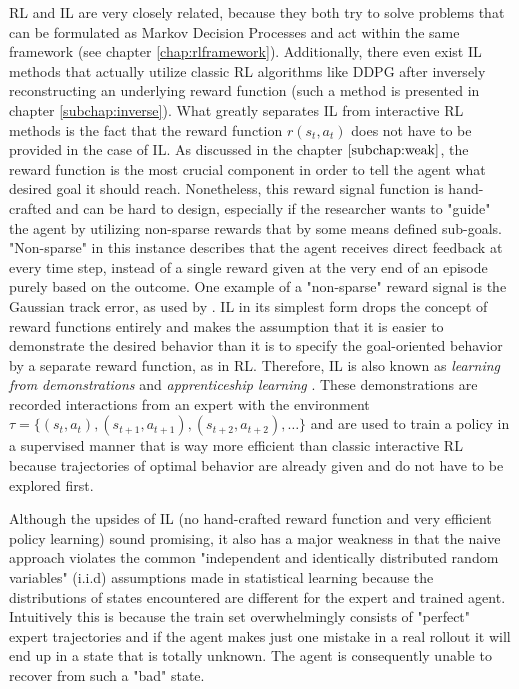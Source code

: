 \par
RL and IL are very closely related, because they both try to solve problems that can be formulated as Markov Decision Processes and act within the same framework (see chapter \ref{chap:rlframework}). Additionally, there even exist IL methods that actually utilize classic RL algorithms like DDPG after inversely reconstructing an underlying reward function (such a method is presented in chapter \ref{subchap:inverse}). What greatly separates IL from interactive RL methods is the fact that the reward function $r(s_t, a_t)$ does not have to be provided in the case of IL. As discussed in the chapter $\ref{subchap:weak}$, the reward function is the most crucial component in order to tell the agent what desired goal it should reach. Nonetheless, this reward signal function is hand-crafted and can be hard to design, especially if the researcher wants to "guide" the agent by utilizing non-sparse rewards  that by some means defined sub-goals. "Non-sparse" in this instance describes that the agent receives direct feedback at every time step, instead of a single reward given at the very end of an episode purely based on the outcome. One example of a "non-sparse" reward signal is the Gaussian track error, as used by \cite{martinsen2018curved}.
IL in its simplest form drops the concept of reward functions entirely and makes the assumption that it is easier to demonstrate the desired behavior than it is to specify the goal-oriented behavior by a separate reward function, as in RL. Therefore, IL is also known as \textit{learning from demonstrations} and \textit{apprenticeship learning} \cite[p.~470]{Sutton1998}. These demonstrations are recorded interactions from an expert with the environment $\tau = \{(s_t, a_t), (s_{t+1}, a_{t+1}), (s_{t+2}, a_{t+2}), \dots\}$ and are used to train a policy in a supervised manner that is way more efficient than classic interactive RL because trajectories of optimal behavior are already given and do not have to be explored first.
\par
Although the upsides of IL (no hand-crafted reward function and very efficient policy learning) sound promising, it also has a major weakness in that the naive approach violates the common "independent and identically distributed random variables" (i.i.d) assumptions made in statistical learning \cite{ross2011reduction} because the distributions of states encountered are different for the expert and trained agent. Intuitively this is because the train set overwhelmingly consists of "perfect" expert trajectories and if the agent makes just one mistake in a real rollout it will end up in a state that is totally unknown. The agent is consequently unable to recover from such a "bad" state.


